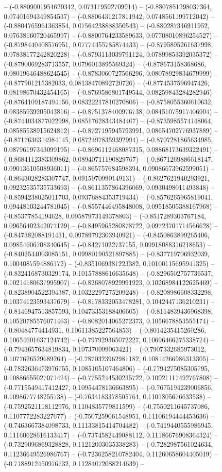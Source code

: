 -- (-0.8809001954620342, 0.073119592709914) -- (-0.8807851298037364, 0.07401694349854537) -- (-0.8806431217811942, 0.0748561199712042) -- (-0.8804765961363854, 0.07564238888350543) -- (-0.880287346911952, 0.07638160720465997) -- (-0.8800764233589633, 0.07708010896254527) -- (-0.8798440408576951, 0.07774455785874433) -- (-0.8795895261637998, 0.07838177242820228) -- (-0.8793113039791124, 0.07899853392035372) -- (-0.8790069283713557, 0.0796013895569324) -- (-0.878673158368686, 0.08019646488624545) -- (-0.8783060727566296, 0.08078929834679999) -- (-0.877901215382033, 0.08138470892720726) -- (-0.8774537596947426, 0.08198670432454165) -- (-0.8769586801749544, 0.08259843284282946) -- (-0.8764109187494156, 0.08322217810270806) -- (-0.8758055360610632, 0.08385939205043816) -- (-0.8751378400976738, 0.08451075917406904) -- (-0.8744034877022998, 0.08517628343484407) -- (-0.8735985574148064, 0.08585538915624812) -- (-0.8727195945793991, 0.08654702776937889) -- (-0.8717636314984145, 0.08724978359392994) -- (-0.8707281865634985, 0.08796197343099195) -- (-0.8696112468087315, 0.08868173639322491) -- (-0.8684112383309862, 0.08940711190829767) -- (-0.8671269886618147, 0.09013610508936011) -- (-0.865757684598394, 0.09086673962599051) -- (-0.8643028283307747, 0.0915970990149131) -- (-0.8627621940293921, 0.09232535735733693) -- (-0.8611357864396069, 0.0930498011493848) -- (-0.8594238025011703, 0.09376884353719434) -- (-0.8576265965819041, 0.09448103244781045) -- (-0.8557446495848008, 0.09518505388167968) -- (-0.85377854194628, 0.09587973149378803) -- (-0.8517289303767184, 0.09656402342077129) -- (-0.8495965280878722, 0.09723701714566628) -- (-0.847382088191431, 0.09789792303940921) -- (-0.8450863899265406, 0.09854606708340645) -- (-0.84271022737155, 0.09918088316218653) -- (-0.8402544003085151, 0.09980190521897885) -- (-0.837719706932039, 0.1004087594886172) -- (-0.8351069381223382, 0.10100115695941325) -- (-0.8324168730329174, 0.10157888616635648) -- (-0.8296502757736537, 0.10214180637995907) -- (-0.8268078929991923, 0.10268984122625469) -- (-0.8238904522394387, 0.10322297275209248) -- (-0.8208986608332298, 0.10374123593437679) -- (-0.8178332053478281, 0.1042447136210231) -- (-0.8146947513857593, 0.10473353188406605) -- (-0.8114839436968398, 0.10520785576071463) -- (-0.8082014065272373, 0.1056678853555174) -- (-0.80484774414931, 0.10611385227564853) -- (-0.8014235415260286, 0.10654601637124742) -- (-0.797929365072227, 0.10696466275338724) -- (-0.7943657634819834, 0.107370099063421) -- (-0.7907332685973012, 0.1077626529689264) -- (-0.7870323962981182, 0.10814266986313305) -- (-0.7832636473976755, 0.1085105107464806) -- (-0.7794275085305795, 0.10886655027071424) -- (-0.7755244530235722, 0.10921117492767808) -- (-0.7715549417412427, 0.10954478136663895) -- (-0.7675194239006856, 0.1098677748255738) -- (-0.7634183378505764, 0.1101805676633538) -- (-0.7592521118112976, 0.1104835779811599) -- (-0.7550211645737086, 0.1107772283227677) -- (-0.7507259061548951, 0.11106194444453636) -- (-0.7463667384098733, 0.11133815414704482) -- (-0.7419440555986945, 0.11160628616133417) -- (-0.7374582449088112, 0.11186676908364324) -- (-0.7329096869328828, 0.11212003035338283) -- (-0.7282987561024634, 0.11236649526986767) -- (-0.7236258210782404, 0.11260658604405019) -- (-0.7188912450976732, 0.11284072088214639) -- 